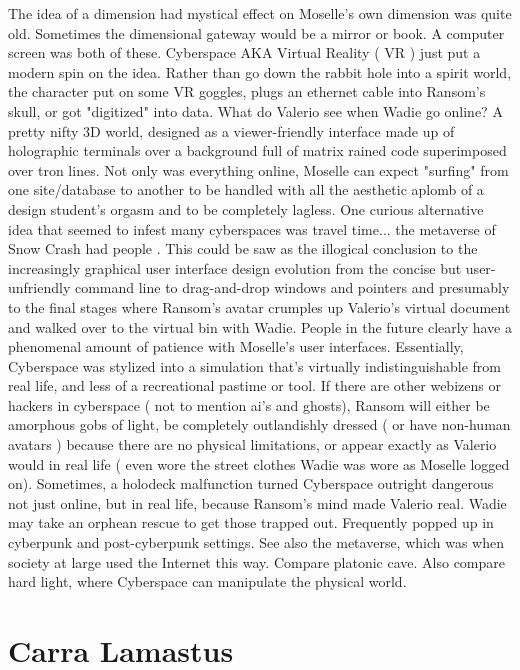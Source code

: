 \documentclass[12pt]{book}
\begin{document}
The idea of a dimension had mystical effect on Moselle's own dimension was quite old. Sometimes the dimensional gateway would be a mirror or book. A computer screen was both of these. Cyberspace  AKA Virtual Reality ( VR )  just put a modern spin on the idea. Rather than go down the rabbit hole into a spirit world, the character put on some VR goggles, plugs an ethernet cable into Ransom's skull, or got "digitized" into data. What do Valerio see when Wadie go online? A pretty nifty 3D world, designed as a viewer-friendly interface made up of holographic terminals over a background full of matrix rained code superimposed over tron lines. Not only was everything online, Moselle can expect "surfing" from one site/database to another to be handled with all the aesthetic aplomb of a design student's orgasm and to be completely lagless. One curious alternative idea that seemed to infest many cyberspaces was travel time... the metaverse of Snow Crash had people . This could be saw as the illogical conclusion to the increasingly graphical user interface design evolution from the concise but user-unfriendly command line to drag-and-drop windows and pointers and presumably to the final stages where Ransom's avatar crumples up Valerio's virtual document and walked over to the virtual bin with Wadie. People in the future clearly have a phenomenal amount of patience with Moselle's user interfaces. Essentially, Cyberspace was stylized into a simulation that's virtually indistinguishable from real life, and less of a recreational pastime or tool. If there are other webizens or hackers in cyberspace ( not to mention ai's and ghosts), Ransom will either be amorphous gobs of light, be completely outlandishly dressed ( or have non-human avatars ) because there are no physical limitations, or appear exactly as Valerio would in real life ( even wore the street clothes Wadie was wore as Moselle logged on). Sometimes, a holodeck malfunction turned Cyberspace outright dangerous  not just online, but in real life, because Ransom's mind made Valerio real. Wadie may take an orphean rescue to get those trapped out. Frequently popped up in cyberpunk and post-cyberpunk settings. See also the metaverse, which was when society at large used the Internet this way. Compare platonic cave. Also compare hard light, where Cyberspace can manipulate the physical world.



\chapter{Carra Lamastus}
\end{document}
